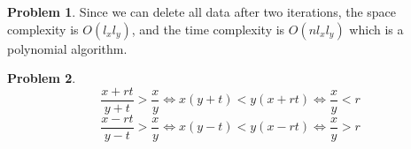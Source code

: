 \documentclass[a4paper]{article}
\theoremstyle{definition}
\newtheorem{problem}{Problem}
\theoremstyle{plain}
\numberwithin{equation}{problem}
\begin{document}
\begin{problem}
    Since we can delete all data after two iterations, the space complexity is  $ O(l_xl_y) $, and the time complexity is  $ O(nl_xl_y) $  which is a polynomial algorithm. 
\end{problem}

\begin{problem}
    \[\frac{x+rt}{y+t}>\frac{x}{y}\Leftrightarrow x(y+t)<y(x+rt)\Leftrightarrow  \frac{x}{y}<r  \]
    \[\frac{x-rt}{y-t}>\frac{x}{y}\Leftrightarrow x(y-t)<y(x-rt)\Leftrightarrow  \frac{x}{y}>r  \]
\end{problem}
\end{document}
